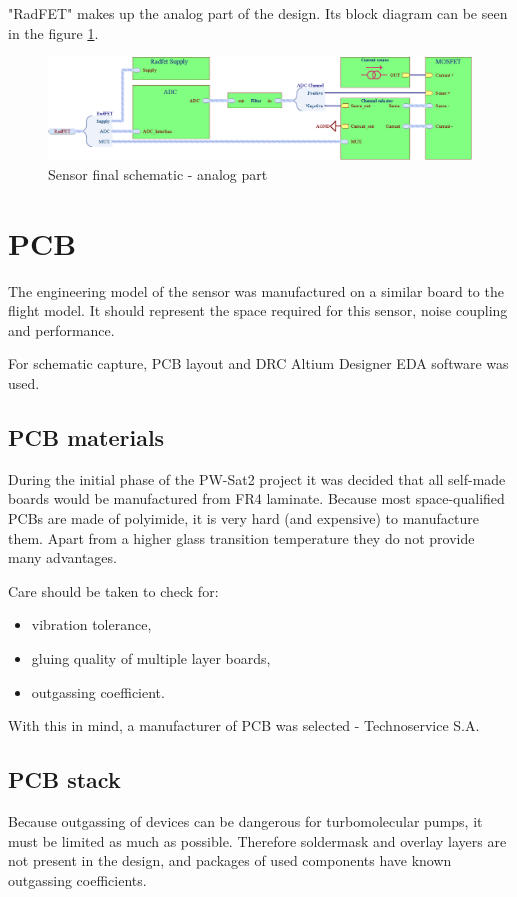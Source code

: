     "RadFET" makes up the analog part of the design. Its block diagram can be seen in the figure \ref{analog_schematic}.

    \begin{figure}[H]
        \centering
        \includegraphics[width=0.8\paperwidth]{img/06/final_schematic_radfet.eps}
        \caption{Sensor final schematic - analog part}
        \label{analog_schematic}
    \end{figure}


\section{PCB}
    The engineering model of the sensor was manufactured on a similar board to the flight model. It should represent the space required for this sensor, noise coupling and performance.

    For schematic capture, PCB layout and DRC Altium Designer EDA software was used.

    \subsection{PCB materials}
        During the initial phase of the PW-Sat2 project it was decided that all self-made boards would be manufactured from FR4 laminate. Because most space-qualified PCBs are made of polyimide, it is very hard (and expensive) to manufacture them. Apart from a higher glass transition temperature they do not provide many advantages.

        Care should be taken to check for:
        \begin{itemize}
            \item vibration tolerance,
            \item gluing quality of multiple layer boards,
            \item outgassing coefficient.
        \end{itemize}

        With this in mind, a manufacturer of PCB was selected - Technoservice S.A.

    \subsection{PCB stack}
        Because outgassing of devices can be dangerous for turbomolecular pumps, it must be limited as much as possible. Therefore soldermask and overlay layers are not present in the design, and packages of used components have known outgassing coefficients.

